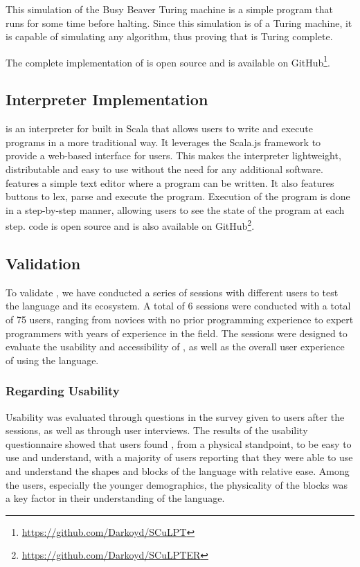 This simulation of the Busy Beaver Turing machine is a simple program that runs for some time before halting.
Since this simulation is of a Turing machine, it is capable of simulating any algorithm, thus proving that \sculpt is Turing complete.

The complete implementation of \sculpt is open source and is available on GitHub\footnote{\url{https://github.com/Darkoyd/SCuLPT}}.

\subsection{Interpreter Implementation}
\label{sec:results:interpreter}
\sculpter is an interpreter for \sculpt built in Scala that allows users to write and execute \sculpt programs in a more traditional way.
It leverages the Scala.js framework to provide a web-based interface for users.
This makes the interpreter lightweight, distributable and easy to use without the need for any additional software.
\sculpter features a simple text editor where a program can be written. It also features buttons to lex, parse and execute the program.
Execution of the program is done in a step-by-step manner, allowing users to see the state of the program at each step.
\sculpter code is open source and is also available on GitHub\footnote{\url{https://github.com/Darkoyd/SCuLPTER}}.


\subsection{Validation}
\label{sec:results:validation}
To validate \sculpt, we have conducted a series of sessions with different users to test the language and its ecosystem.
A total of 6 sessions were conducted with a total of 75 users, ranging from novices with no prior programming experience to expert programmers with years of experience in the field.
The sessions were designed to evaluate the usability and accessibility of \sculpt, as well as the overall user experience of using the language.

\subsubsection{Regarding Usability}
\label{sec:results:validation:usability}
Usability was evaluated through questions in the survey given to users after the sessions, as well as through user interviews.
The results of the usability questionnaire showed that users found \sculpt, from a physical standpoint, to be easy to use and understand, 
with a majority of users reporting that they were able to use and understand the shapes and blocks of the language with relative ease.
Among the users, especially the younger demographics, the physicality of the blocks was a key factor in their understanding of the language.

